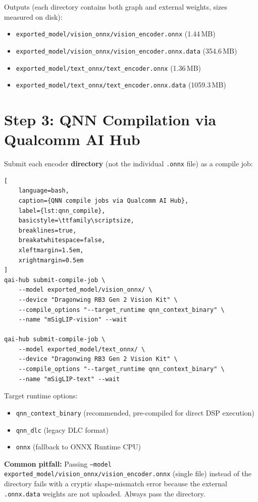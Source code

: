 \documentclass[../main.tex]{subfiles}
\begin{document}
\noindent Outputs (each directory contains both graph and external weights, sizes measured on disk):
\begin{itemize}[itemsep=0.3em, topsep=0.3em]
    \item \texttt{exported\_model/vision\_onnx/vision\_encoder.onnx} (1.44\,MB)
    \item \texttt{exported\_model/vision\_onnx/vision\_encoder.onnx.data} (354.6\,MB)
    \item \texttt{exported\_model/text\_onnx/text\_encoder.onnx} (1.36\,MB)
    \item \texttt{exported\_model/text\_onnx/text\_encoder.onnx.data} (1059.3\,MB)
\end{itemize}

\section{Step 3: QNN Compilation via Qualcomm AI Hub}

\noindent Submit each encoder \textbf{directory} (not the individual \texttt{.onnx} file) as a compile job:

\begin{lstlisting}[
    language=bash,
    caption={QNN compile jobs via Qualcomm AI Hub},
    label={lst:qnn_compile},
    basicstyle=\ttfamily\scriptsize,
    breaklines=true,
    breakatwhitespace=false,
    xleftmargin=1.5em,
    xrightmargin=0.5em
]
qai-hub submit-compile-job \
    --model exported_model/vision_onnx/ \
    --device "Dragonwing RB3 Gen 2 Vision Kit" \
    --compile_options "--target_runtime qnn_context_binary" \
    --name "mSigLIP-vision" --wait

qai-hub submit-compile-job \
    --model exported_model/text_onnx/ \
    --device "Dragonwing RB3 Gen 2 Vision Kit" \
    --compile_options "--target_runtime qnn_context_binary" \
    --name "mSigLIP-text" --wait
\end{lstlisting}

\noindent Target runtime options:
\begin{itemize}[itemsep=0.3em, topsep=0.3em]
    \item \texttt{qnn\_context\_binary} (recommended, pre-compiled for direct DSP execution)
    \item \texttt{qnn\_dlc} (legacy DLC format)
    \item \texttt{onnx} (fallback to ONNX Runtime CPU)
\end{itemize}

\noindent \textbf{Common pitfall:} Passing \texttt{--model exported\_model/vision\_onnx/vision\_encoder.onnx} (single file) instead of the directory fails with a cryptic shape-mismatch error because the external \texttt{.onnx.data} weights are not uploaded. Always pass the directory.
\end{document}
